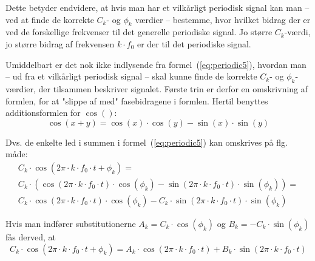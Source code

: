 \documentclass[11pt,a4paper]{article}
\begin{document}
\vspace{\baselineskip}\vspace{\baselineskip}

Dette betyder endvidere, at hvis man har et vilkårligt periodisk signal kan man -- ved at finde de korrekte $C_k$- og $\phi_k$ værdier -- bestemme, hvor hvilket bidrag der er ved de forskellige frekvenser til det generelle periodiske signal. Jo større $C_k$-værdi, jo større bidrag af frekvensen $k\cdot{}f_0$ er der til det periodiske signal.

Umiddelbart er det nok ikke indlysende fra formel~(\ref{eq:periodic5}), hvordan man -- ud fra et vilkårligt periodisk signal -- skal kunne finde de korrekte $C_k$- og $\phi_k$-værdier, der tilsammen beskriver signalet. Første trin er derfor en omskrivning af formlen, for at "slippe af med" fasebidragene i formlen. Hertil benyttes additionsformlen for $\cos()$:
\begin{equation}
\cos(x+y)=\cos(x)\cdot\cos(y)-\sin(x)\cdot\sin(y)
\end{equation}

\noindent{}Dvs. de enkelte led i summen i formel~(\ref{eq:periodic5}) kan omskrives på flg. måde:
\begin{multline*}
C_{k}\cdot\cos(2\pi\cdot{}k\cdot{}f_{0}\cdot{}t+\phi_{k}) = \\
C_{k}\cdot\left(\cos(2\pi\cdot{}k\cdot{}f_{0}\cdot{}t)\cdot\cos(\phi_{k})-\sin(2\pi\cdot{}k\cdot{}f_{0}\cdot{}t)\cdot\sin(\phi_{k})\right)=\\
C_{k}\cdot\cos(2\pi\cdot{}k\cdot{}f_{0}\cdot{}t)\cdot\cos(\phi_{k})-C_{k}\cdot\sin(2\pi\cdot{}k\cdot{}f_{0}\cdot{}t)\cdot\sin(\phi_{k})
\end{multline*}

\noindent{}Hvis man indfører substitutionerne $A_{k}=C_{k}\cdot\cos(\phi_{k})$ og $B_{k}=-C_{k}\cdot\sin(\phi_{k})$ fås derved, at 
\begin{equation*}
C_{k}\cdot\cos(2\pi\cdot{}k\cdot{}f_{0}\cdot{}t+\phi_{k}) = 
A_{k}\cdot\cos(2\pi\cdot{}k\cdot{}f_{0}\cdot{}t)+B_{k}\cdot\sin(2\pi\cdot{}k\cdot{}f_{0}\cdot{}t)
\end{equation*}
\end{document}
